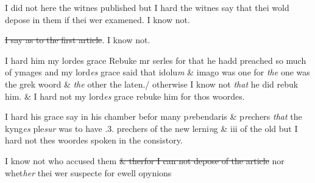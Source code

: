 \documentclass[12pt, a4paper]{book}
\begin{document}
				\marginpar[\vspace{0.5cm}{\textcolor{Gray}{2}}]{}
			

		\ifthenelse{\isodd{\thepage}}
		{\reversemarginpar}
		{\normalmarginpar}
		I did not here the witnes published but I hard the witnes say that
thei wold depose in them if thei wer examened. I know not.

				\marginpar[\vspace{0.5cm}{\textcolor{Gray}{3}}]{}
			

		\ifthenelse{\isodd{\thepage}}
		{\reversemarginpar}
		{\normalmarginpar}
		\sout{I say as to the first article}. I know not. 
			

				\marginpar[\vspace{0.5cm}{\textcolor{Gray}{4}}]{}
			

		\ifthenelse{\isodd{\thepage}}
		{\reversemarginpar}
		{\normalmarginpar}
		I hard him my lordes grace 
			 Rebuke mr serles for that he hadd preached so much of ymages
and my lord\textit{es} grace 
			 said that idolu\textit{m} \& imago was one for \textit{the} one was the grek woord
\& \textit{the} other the laten./ otherwise I know not \textit{that} he did rebuk him.
\& I hard not my lord\textit{es} grace  rebuke him for thos woordes.

				\marginpar[\vspace{0.5cm}{\textcolor{Gray}{5}}]{}
			

		\ifthenelse{\isodd{\thepage}}
		{\reversemarginpar}
		{\normalmarginpar}
		I hard his grace say in his chamber befor many p\textit{re}bendaris \& p\textit{re}chers \textit{that}
the kyng\textit{es} ple\textit{sur} was to have .3. prechers of the new lerni\textit{n}g \& iii
of the old but I hard not thes woordes spoken in the consistory.

				\marginpar[\vspace{0.5cm}{\textcolor{Gray}{6}}]{}
			
 I know not who accused them \sout{\& therfor I can not depose of the article}
               nor whet\textit{her} thei wer suspecte for ewell opynions
			

				\marginpar[\vspace{0.5cm}{\textcolor{Gray}{7}}]{}
			
\end{document}

